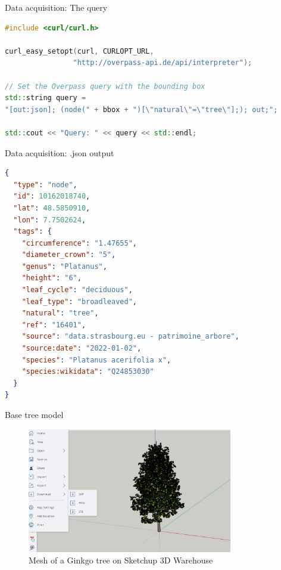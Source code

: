 \documentclass[10pt]{beamer}
\begin{document}
\begin{frame}[fragile]{Data acquisition: The query}
  \begin{lstlisting}[language=C++]
#include <curl/curl.h>

curl_easy_setopt(curl, CURLOPT_URL,
                "http://overpass-api.de/api/interpreter");

// Set the Overpass query with the bounding box
std::string query =
"[out:json]; (node(" + bbox + ")[\"natural\"=\"tree\"];); out;";

std::cout << "Query: " << query << std::endl;
  \end{lstlisting}
\end{frame}


\begin{frame}[fragile]{Data acquisition: .json output}
\begin{lstlisting}[language=json]
{
  "type": "node",
  "id": 10162018740,
  "lat": 48.5850910,
  "lon": 7.7502624,
  "tags": {
    "circumference": "1.47655",
    "diameter_crown": "5",
    "genus": "Platanus",
    "height": "6",
    "leaf_cycle": "deciduous",
    "leaf_type": "broadleaved",
    "natural": "tree",
    "ref": "16401",
    "source": "data.strasbourg.eu - patrimoine_arbore",
    "source:date": "2022-01-02",
    "species": "Platanus acerifolia x",
    "species:wikidata": "Q24853030"
  }
}
\end{lstlisting}
\end{frame}

\begin{frame}{Base tree model}
\begin{figure}[H]
    \centering
        \centering
        \includegraphics[width=0.8\textwidth]{images/ginkgo_sketchup.png}
        \caption{Mesh of a Ginkgo tree on Sketchup 3D Warehouse}
\end{figure}
\end{frame}
\end{document}
